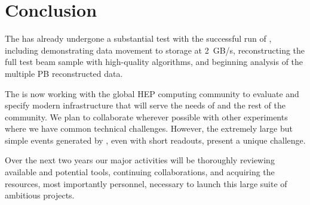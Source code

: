 \section{Conclusion}

The   has already undergone a substantial test with the successful run of , including demonstrating data movement to storage at \SI{2}{GB/s}, reconstructing the full test beam sample with high-quality algorithms, and beginning analysis of the multiple PB reconstructed data. 

The  is now working with the global HEP computing community to evaluate and specify modern infrastructure that will serve the needs of  and the rest of the community.  We plan to collaborate wherever possible with other experiments where we have common technical challenges. However, the extremely large but simple events generated by  , even with short readouts, present a unique challenge. 

Over the next two years our major activities  will be  thoroughly reviewing available and potential tools, continuing collaborations, and acquiring the resources, most importantly personnel,  necessary to launch this large suite of ambitious projects. 
